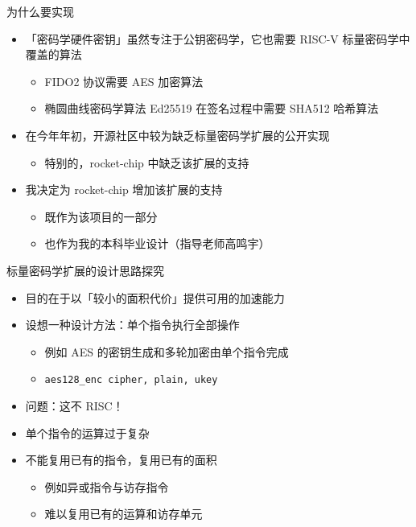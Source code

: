 \documentclass[aspectratio=169]{ctexbeamer}
\begin{document}
\begin{frame}{为什么要实现}
  \begin{itemize}
    \item 「密码学硬件密钥」虽然专注于公钥密码学，它也需要 RISC-V 标量密码学中覆盖的算法\begin{itemize}
      \item FIDO2 协议需要 AES 加密算法
      \item 椭圆曲线密码学算法 Ed25519 在签名过程中需要 SHA512 哈希算法
    \end{itemize}
    \item<2-> 在今年年初，开源社区中较为缺乏标量密码学扩展的公开实现\begin{itemize}
      \item 特别的，rocket-chip 中缺乏该扩展的支持
    \end{itemize}
    \item<3-> 我决定为 rocket-chip 增加该扩展的支持\begin{itemize}
      \item 既作为该项目的一部分
      \item 也作为我的本科毕业设计（指导老师高鸣宇）
    \end{itemize}
  \end{itemize}
\end{frame}

\begin{frame}{标量密码学扩展的设计思路探究}
  \begin{itemize}
    \item 目的在于以「较小的面积代价」提供可用的加速能力
    \item 设想一种设计方法：单个指令执行全部操作\begin{itemize}
      \item 例如 AES 的密钥生成和多轮加密由单个指令完成
      \item \texttt{aes128\_enc cipher, plain, ukey}
    \end{itemize}
    \item<2-> 问题：这不 RISC！
    \item<2-> 单个指令的运算过于复杂
    \item<2-> 不能复用已有的指令，复用已有的面积\begin{itemize}
      \item 例如异或指令与访存指令
      \item 难以复用已有的运算和访存单元
    \end{itemize}
  \end{itemize}
\end{frame}
\end{document}
